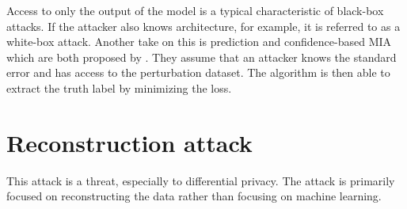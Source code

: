Access to only the output of the model is a typical characteristic of black-box attacks. If the attacker also knows architecture, for example, it is referred to as a white-box attack.
Another take on this is prediction and confidence-based MIA which are both proposed by \citep{yeom_privacy_2018}.
They assume that an attacker knows the standard error and has access to the perturbation dataset.
The algorithm is then able to extract the truth label by minimizing the loss. \newline






\newpage
\section{Reconstruction attack}
This attack is a threat, especially to differential privacy.
The attack is primarily focused on reconstructing the data rather than focusing on machine learning.



